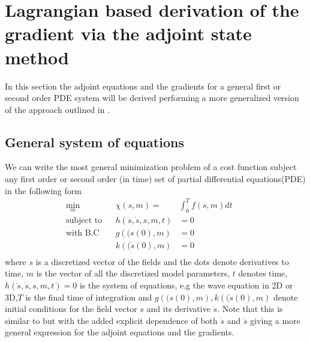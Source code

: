 \documentclass[10pt]{SelfArx} %
\theoremstyle{definition}
\begin{document}
\section{Lagrangian based derivation of the gradient via the adjoint state method}\label{sec:general_math}
In this section the adjoint equations and the gradients for a general first or second order PDE system will be derived performing a more generalized version of the approach outlined in \cite{Bradley2012}.
\subsection{General system of equations}
\label{sec:general_system}
We can write the most general minimization problem of a cost function subject any first order or second order (in time) set of partial differential equations(PDE) in the following form
\begin{equation}
\label{eq:general_system}
\begin{aligned}
\underset{m}{\text{min}} &&  \chi\left(s,m\right) = &  \int_0^T f\left(s,m\right) dt & &\\
\text{subject to} & & h\left(\ddot{s}, \dot{s}, s, m, t\right) & =  0 \\
 \text{with B.C} & & g\left((s\left(0\right), m\right) & = 0 \\
 & & k\left((\dot{s}\left(0\right), m\right) & = 0 \\
\end{aligned}
\end{equation}
where $s$ is a discretized vector of the fields and the dots denote derivatives to time, $m$ is the vector of all the discretized model parameters, $t$ denotes time, $h\left(\ddot{s}, \dot{s}, s, m, t\right)  =  0$ is the system of equations, e.g the wave equation in 2D or 3D,$T$ is the final time of integration and $g\left((s\left(0\right), m\right), k\left((\dot{s}\left(0\right), m\right)$ denote initial conditions for the field vector $s$ and its derivative $\dot{s}$. Note that this is similar to \cite{Bradley2012} but with the added explicit dependence of both $\dot s$ and $\ddot s$ giving a more general expression for the adjoint equations and the gradients. 
\end{document}
